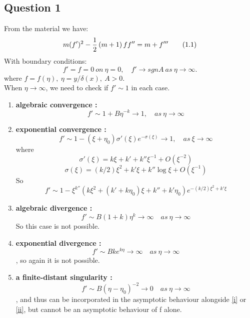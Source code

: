 \documentclass[a4paper,11pt]{article}
\begin{document}
\subsection{Question 1}
From the material we have:
\begin{equation*} \label{1.1}
m(f')^{2} - \frac{1}{2}\left(m+1\right)ff'' = m+f''' \tag{1.1}\\
\end{equation*}
With boundary conditions: \begin{equation} \label{1.2}
f' = f = 0\ on\ \eta = 0,\quad f' \to sgnA\ as\ \eta \to \infty . \tag{1.2}
\end{equation}
where $f = f(\eta),\ \eta = y/\delta(x), \ A>0.$\\
When $\eta \to \infty$, we need to check if $f' \sim 1$ in each case.
\begin{enumerate}[label = (\roman*)]
     \item \textbf{algebraic convergence :}\\ \label{i}
     $$f' \sim 1 + B\eta^{-k}  \to 1,\quad as\ \eta \to \infty$$ 

      \item \textbf{exponential convergence :}\\ \label{ii}
      $$f' \sim 1-(\xi+\eta_{0}) \sigma'(\xi) e^{-\sigma(\xi)}  \to 1, \quad as\ \xi \to \infty$$
      where
      $$\sigma'(\xi) = k\xi +k'+k''\xi^{-1} +O(\xi^{-2})$$
      $$\sigma(\xi) = (k/2) \xi^{2} +k' \xi +k'' \log{\xi} + O(\xi^{-1})$$
     So 
     $$f' \sim 1-\xi^{k''}(k\xi^2 + (k'+k\eta_{0})\xi +k''+k'\eta_{0} )e^{-(k/2) \xi^{2} +k' \xi}$$

    \item \textbf{algebraic divergence :}\\ 
    $$f' \sim B(1+k)\eta^{k} \to \infty \quad as\ \eta \to \infty $$ So this case is not possible.
    \item \textbf{exponential divergence :}\\
    $$f' \sim Bke^{k\eta} \to \infty \quad as\ \eta \to \infty$$, so again it is not possible.
    
    \item \textbf{a finite-distant singularity :}\\
    $$f' \sim  B(\eta-\eta_{0})^{-2} \to 0  \quad as\ \eta \to \infty$$, and thus can be incorporated in the asymptotic behaviour alongside \ref{i} or \ref{ii}, but cannot be an asymptotic behaviour of f alone.
\end{enumerate}
\end{document}
